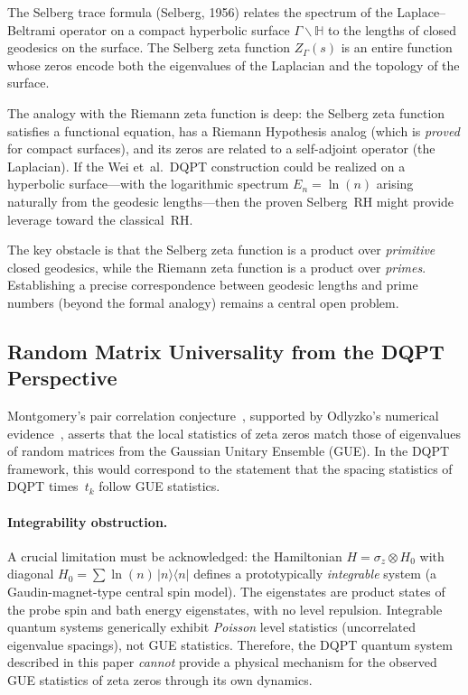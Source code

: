 The Selberg trace formula (Selberg, 1956) relates the spectrum of the Laplace--Beltrami
operator on a compact hyperbolic surface $\Gamma\backslash\mathbb{H}$ to the lengths of
closed geodesics on the surface. The Selberg zeta function $Z_\Gamma(s)$ is an entire
function whose zeros encode both the eigenvalues of the Laplacian and the topology of
the surface.

The analogy with the Riemann zeta function is deep: the Selberg zeta function satisfies a
functional equation, has a Riemann Hypothesis analog (which is \emph{proved} for compact
surfaces), and its zeros are related to a self-adjoint operator (the Laplacian). If the
Wei et~al.\ DQPT construction could be realized on a hyperbolic surface---with the
logarithmic spectrum $E_n = \ln(n)$ arising naturally from the geodesic lengths---then the
proven Selberg~RH might provide leverage toward the classical~RH.

The key obstacle is that the Selberg zeta function is a product over \emph{primitive}
closed geodesics, while the Riemann zeta function is a product over \emph{primes}.
Establishing a precise correspondence between geodesic lengths and prime numbers (beyond
the formal analogy) remains a central open problem.


\subsection{Random Matrix Universality from the DQPT Perspective}
\label{sec:rmt}

Montgomery's pair correlation conjecture~\cite{montgomery1973}, supported by Odlyzko's
numerical evidence~\cite{odlyzko1989}, asserts that the local statistics of zeta zeros
match those of eigenvalues of random matrices from the Gaussian Unitary Ensemble (GUE).
In the DQPT framework, this would correspond to the statement that the spacing statistics
of DQPT times~$t_k$ follow GUE statistics.

\paragraph{Integrability obstruction.}
A crucial limitation must be acknowledged: the Hamiltonian
$H = \sigma_z \otimes H_0$ with diagonal $H_0 = \sum \ln(n)\,|n\rangle\langle n|$
defines a prototypically \emph{integrable} system (a Gaudin-magnet-type central spin
model). The eigenstates are product states of the probe spin and bath energy eigenstates,
with no level repulsion. Integrable quantum systems generically exhibit \emph{Poisson}
level statistics (uncorrelated eigenvalue spacings), not GUE statistics. Therefore, the
DQPT quantum system described in this paper \emph{cannot} provide a physical mechanism
for the observed GUE statistics of zeta zeros through its own dynamics.

